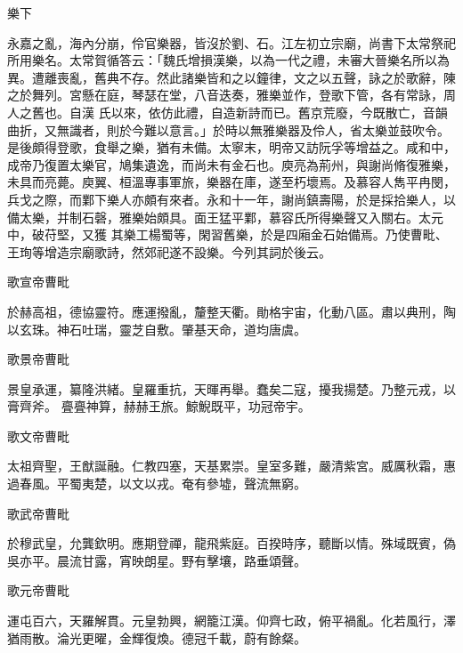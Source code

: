 
\begin{pinyinscope}

 樂下



 永嘉之亂，海內分崩，伶官樂器，皆沒於劉、石。江左初立宗廟，尚書下太常祭祀所用樂名。太常賀循答云：「魏氏增損漢樂，以為一代之禮，未審大晉樂名所以為異。遭離喪亂，舊典不存。然此諸樂皆和之以鐘律，文之以五聲，詠之於歌辭，陳之於舞列。宮懸在庭，琴瑟在堂，八音迭奏，雅樂並作，登歌下管，各有常詠，周人之舊也。自漢
 氏以來，依仿此禮，自造新詩而已。舊京荒廢，今既散亡，音韻曲折，又無識者，則於今難以意言。」於時以無雅樂器及伶人，省太樂並鼓吹令。是後頗得登歌，食舉之樂，猶有未備。太寧末，明帝又訪阮孚等增益之。咸和中，成帝乃復置太樂官，鳩集遺逸，而尚未有金石也。庾亮為荊州，與謝尚脩復雅樂，未具而亮薨。庾翼、桓溫專事軍旅，樂器在庫，遂至朽壞焉。及慕容人雋平冉閔，兵戈之際，而鄴下樂人亦頗有來者。永和十一年，謝尚鎮壽陽，於是採拾樂人，以備太樂，并制石磬，雅樂始頗具。面王猛平鄴，慕容氏所得樂聲又入關右。太元中，破苻堅，又獲
 其樂工楊蜀等，閑習舊樂，於是四廂金石始備焉。乃使曹毗、王珣等增造宗廟歌詩，然郊祀遂不設樂。今列其詞於後云。



 歌宣帝曹毗



 於赫高祖，德協靈符。應運撥亂，釐整天衢。勛格宇宙，化動八區。肅以典刑，陶以玄珠。神石吐瑞，靈芝自敷。肇基天命，道均唐虞。



 歌景帝曹毗



 景皇承運，纂隆洪緒。皇羅重抗，天暉再舉。蠢矣二寇，擾我揚楚。乃整元戎，以膏齊斧。
 亹亹神算，赫赫王旅。鯨鯢既平，功冠帝宇。



 歌文帝曹毗



 太祖齊聖，王猷誕融。仁教四塞，天基累崇。皇室多難，嚴清紫宮。威厲秋霜，惠過春風。平蜀夷楚，以文以戎。奄有參墟，聲流無窮。



 歌武帝曹毗



 於穆武皇，允龔欽明。應期登禪，龍飛紫庭。百揆時序，聽斷以情。殊域既賓，偽吳亦平。晨流甘露，宵映朗星。野有擊壤，路垂頌聲。



 歌元帝曹毗



 運屯百六，天羅解貫。元皇勃興，網籠江漢。仰齊七政，俯平禍亂。化若風行，澤猶雨散。淪光更曜，金輝復煥。德冠千載，蔚有餘粲。




\end{pinyinscope}
